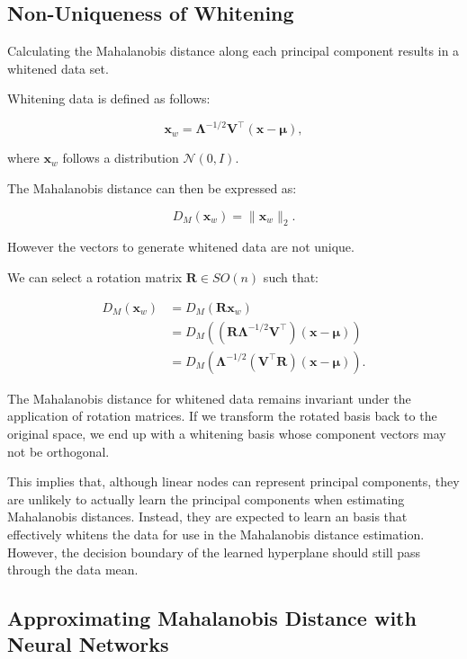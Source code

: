 \subsection{Non-Uniqueness of Whitening}

Calculating the Mahalanobis distance along each principal component results in a whitened data set. 

Whitening data is defined as follows:

\[
\mathbf{x}_w = \boldsymbol{\Lambda}^{-1/2} \mathbf{V}^\top (\mathbf{x} - \boldsymbol{\mu}),
\]

where \(\mathbf{x}_w\) follows a distribution \(\mathcal{N}(0, I)\).

The Mahalanobis distance can then be expressed as:

\[
D_M(\mathbf{x}_w) = \|\mathbf{x}_w\|_2.
\]

However the vectors to generate whitened data are not unique.

We can select a rotation matrix \(\mathbf{R} \in SO(n)\) such that:

\begin{align}
    D_M(\mathbf{x}_w) &= D_M(\mathbf{R} \mathbf{x}_w) \\
                      &= D_M\left( (\mathbf{R} \boldsymbol{\Lambda}^{-1/2} \mathbf{V}^\top) (\mathbf{x} - \boldsymbol{\mu}) \right) \\
                      &= D_M\left( \boldsymbol{\Lambda}^{-1/2} (\mathbf{V}^\top \mathbf{R}) (\mathbf{x} - \boldsymbol{\mu}) \right).
    \end{align}
    
The Mahalanobis distance for whitened data remains invariant under the application of rotation matrices. If we transform the rotated basis back to the original space, we end up with a whitening basis whose component vectors may not be orthogonal.

This implies that, although linear nodes can represent principal components, they are unlikely to actually learn the principal components when estimating Mahalanobis distances. Instead, they are expected to learn an basis that effectively whitens the data for use in the Mahalanobis distance estimation. However, the decision boundary of the learned hyperplane should still pass through the data mean.

\subsection{Approximating Mahalanobis Distance with Neural Networks}

